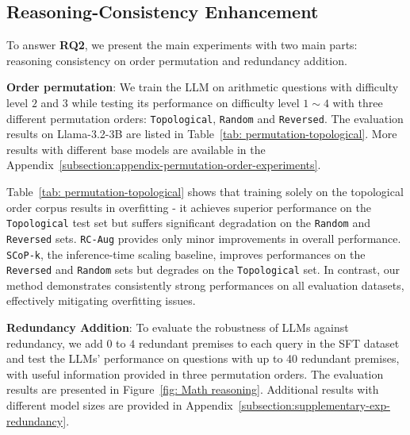 \subsection{Reasoning-Consistency Enhancement}
\label{subsection:exp reasoning-equivalence enhancement}
To answer \textbf{RQ2}, we present the main experiments with two main parts: reasoning consistency on order permutation and redundancy addition.

\textbf{Order permutation}: We train the LLM on arithmetic questions with difficulty level $2$ and $3$ while testing its performance on difficulty level $1\sim4$ with three different permutation orders: \texttt{Topological}, \texttt{Random} and \texttt{Reversed}. The evaluation results on Llama-3.2-3B are listed in Table~\ref{tab: permutation-topological}. More results with different base models are available in the Appendix~\ref{subsection:appendix-permutation-order-experiments}.



Table~\ref{tab: permutation-topological} shows that training solely on the topological order corpus results in overfitting - it achieves superior performance on the \texttt{Topological} test set but suffers significant degradation on the \texttt{Random} and \texttt{Reversed} sets. \texttt{RC-Aug} provides only minor improvements in overall performance. \texttt{SCoP-k}, the inference-time scaling baseline, improves performances on the \texttt{Reversed} and \texttt{Random} sets but degrades on the \texttt{Topological} set. In contrast, our method demonstrates consistently strong performances on all evaluation datasets, effectively mitigating overfitting issues.


\textbf{Redundancy Addition}: To evaluate the robustness of LLMs against redundancy, we add $0$ to $4$ redundant premises to each query in the SFT dataset and test the LLMs' performance on questions with up to 40 redundant premises, with useful information provided in three permutation orders. The evaluation results are presented in Figure~\ref{fig: Math reasoning}. Additional results with different model sizes are provided in Appendix~\ref{subsection:supplementary-exp-redundancy}.


